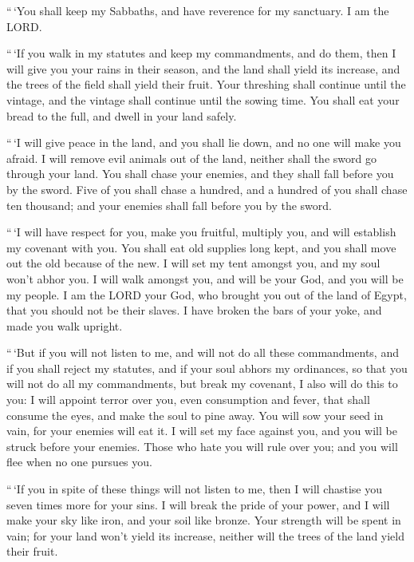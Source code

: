  ``\,`You shall keep my Sabbaths, and have reverence for my
sanctuary. I am the LORD.

 ``\,`If you walk in my statutes and keep my commandments,
and do them,  then I will give you your rains in their
season, and the land shall yield its increase, and the trees of the
field shall yield their fruit.  Your threshing shall
continue until the vintage, and the vintage shall continue until the
sowing time. You shall eat your bread to the full, and dwell in your
land safely.

 ``\,`I will give peace in the land, and you shall lie down,
and no one will make you afraid. I will remove evil animals out of the
land, neither shall the sword go through your land.  You
shall chase your enemies, and they shall fall before you by the sword.
 Five of you shall chase a hundred, and a hundred of you
shall chase ten thousand; and your enemies shall fall before you by the
sword.

 ``\,`I will have respect for you, make you fruitful,
multiply you, and will establish my covenant with you.  You
shall eat old supplies long kept, and you shall move out the old because
of the new.  I will set my tent amongst you, and my soul
won't abhor you.  I will walk amongst you, and will be your
God, and you will be my people.  I am the LORD your God,
who brought you out of the land of Egypt, that you should not be their
slaves. I have broken the bars of your yoke, and made you walk upright.

 ``\,`But if you will not listen to me, and will not do all
these commandments,  and if you shall reject my statutes,
and if your soul abhors my ordinances, so that you will not do all my
commandments, but break my covenant,  I also will do this
to you: I will appoint terror over you, even consumption and fever, that
shall consume the eyes, and make the soul to pine away. You will sow
your seed in vain, for your enemies will eat it.  I will
set my face against you, and you will be struck before your enemies.
Those who hate you will rule over you; and you will flee when no one
pursues you.

 ``\,`If you in spite of these things will not listen to
me, then I will chastise you seven times more for your sins.
 I will break the pride of your power, and I will make your
sky like iron, and your soil like bronze.  Your strength
will be spent in vain; for your land won't yield its increase, neither
will the trees of the land yield their fruit.

